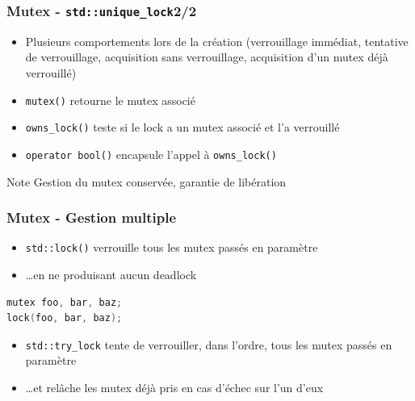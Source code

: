 \documentclass[C++.tex]{subfiles}
\begin{document}
\begin{frame}[fragile]
	\frametitle{Mutex - \lstinline|std::unique_lock|\titlehfill{}2/2}
	\begin{itemize}
		\item Plusieurs comportements lors de la création (verrouillage immédiat, tentative de verrouillage, acquisition sans verrouillage, acquisition d'un mutex déjà verrouillé)
		\item \lstinline|mutex()| retourne le mutex associé
		\item \lstinline|owns_lock()| teste si le lock a un mutex associé et l'a verrouillé
		\item \lstinline|operator bool()| encapsule l'appel à \lstinline|owns_lock()|
	\end{itemize}

	\begin{block}{Note}
		Gestion du mutex conservée, garantie de libération
	\end{block}
\end{frame}

\begin{frame}[fragile]
	\frametitle{Mutex - Gestion multiple}
	\begin{itemize}
		\item \lstinline|std::lock()| verrouille tous les mutex passés en paramètre
		\item \ldots{}en ne produisant aucun deadlock
	\end{itemize}

	\begin{lstlisting}[language=C++]
mutex foo, bar, baz;
lock(foo, bar, baz);\end{lstlisting}

	\begin{itemize}
		\item \lstinline|std::try_lock| tente de verrouiller, dans l'ordre, tous les mutex passés en paramètre
		\item \ldots{}et relâche les mutex déjà pris en cas d'échec sur l'un d'eux
	\end{itemize}
\end{frame}
\end{document}
